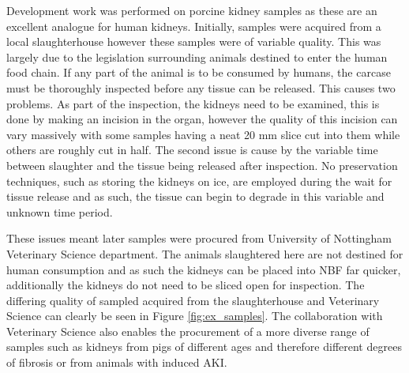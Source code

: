 Development work was performed on porcine kidney samples as these are an excellent analogue for human kidneys. Initially, samples were acquired from a local slaughterhouse however these samples were of variable quality. This was largely due to the legislation surrounding animals destined to enter the human food chain. If any part of the animal is to be consumed by humans, the carcase must be thoroughly inspected before any tissue can be released. This causes two problems. As part of the inspection, the kidneys need to be examined, this is done by making an incision in the organ, however the quality of this incision can vary massively with some samples having a neat 20 mm slice cut into them while others are roughly cut in half. The second issue is cause by the variable time between slaughter and the tissue being released after inspection. No preservation techniques, such as storing the kidneys on ice, are employed during the wait for tissue release and as such, the tissue can begin to degrade in this variable and unknown time period.

These issues meant later samples were procured from University of Nottingham Veterinary Science department. The animals slaughtered here are not destined for human consumption and as such the kidneys can be placed into \ac{NBF} far quicker, additionally the kidneys do not need to be sliced open for inspection. The differing quality of sampled acquired from the slaughterhouse and Veterinary Science can clearly be seen in Figure \ref{fig:ex_samples}. The collaboration with Veterinary Science also enables the procurement of a more diverse range of samples such as kidneys from pigs of different ages and therefore different degrees of fibrosis or from animals with induced \ac{AKI}.  


